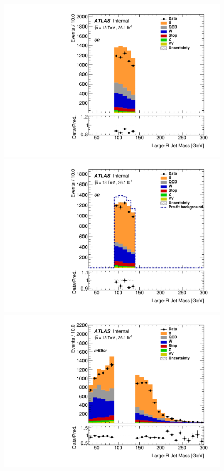 \begin{figure}[!htbp]
\begin{center}
\includegraphics[scale=0.33]{./figures/boosted/ABCD_1tag0bjet/QCDFloat_1tag_SRmBBcrFit_SR_El_Prefit} 
\includegraphics[scale=0.33]{./figures/boosted/ABCD_1tag0bjet/QCDFloat_1tag_SRmBBcrFit_SR_El_Postfit}\\
\includegraphics[scale=0.33]{./figures/boosted/ABCD_1tag0bjet/QCDFloat_1tag_SRmBBcrFit_mBBcr_El_Prefit}  

\end{center}
\end{figure}
